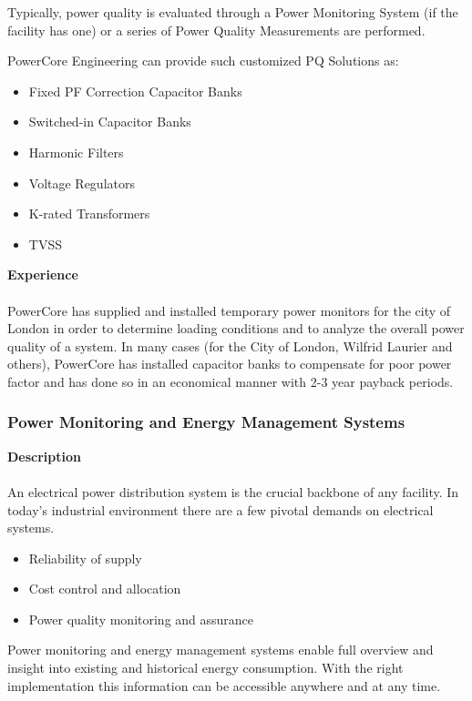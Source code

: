 Typically, power quality is evaluated through a Power Monitoring System (if the facility has one) or a series of Power Quality Measurements are performed. 

PowerCore Engineering can provide such customized PQ Solutions as:
\begin{itemize}
	\item Fixed PF Correction Capacitor Banks
	\item Switched-in Capacitor Banks
	\item Harmonic Filters
	\item Voltage Regulators
	\item K-rated Transformers
	\item TVSS
\end{itemize}


\textbf{Experience}\\
\\	
PowerCore has supplied and installed temporary power monitors for the city of London in order to determine loading conditions and to analyze the overall power quality of a system.  In many cases (for the City of London, Wilfrid Laurier and others), PowerCore has installed capacitor banks to compensate for poor power factor and has done so in an economical manner with 2-3 year payback periods. 

\subsubsection{Power Monitoring and Energy Management Systems}
\label{Sub:Exp:PM}

\textbf{Description}\\
\\	
An electrical power distribution system is the crucial backbone of any facility. In today's industrial environment there are a few pivotal demands on electrical systems. 
\begin{itemize}
	\item Reliability of supply
	\item Cost control and allocation
	\item Power quality monitoring and assurance
\end{itemize}

Power monitoring and energy management systems enable full overview and insight into existing and historical energy consumption. With the right implementation this information can be accessible anywhere and at any time. 

